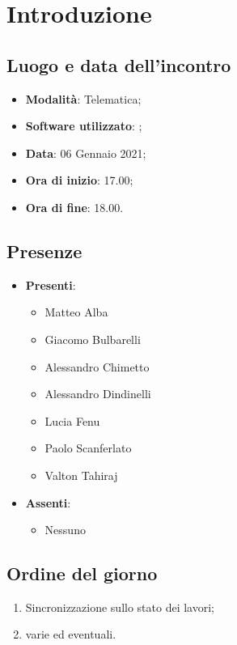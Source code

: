 \documentclass[]{article}
\begin{document}
	
	
	
	\newpage
	
	
		\section{Introduzione}
		\subsection{Luogo e data dell'incontro}
		\begin{itemize}
			\item \textbf{Modalità}: Telematica;
			\item \textbf{Software utilizzato}: ;
			\item \textbf{Data}: 06 Gennaio 2021;
			\item \textbf{Ora di inizio}: 17.00;
			\item \textbf{Ora di fine}: 18.00.
		\end{itemize}

		\subsection{Presenze}
		\begin{itemize}
			\item \textbf{Presenti}:
			\begin{itemize}
				\item Matteo Alba
				\item Giacomo Bulbarelli
				\item Alessandro Chimetto
				\item Alessandro Dindinelli
				\item Lucia Fenu
				\item Paolo Scanferlato
				\item Valton Tahiraj
			\end{itemize}
			\item \textbf{Assenti}:
			\begin{itemize}
				\item Nessuno
			\end{itemize}
		\end{itemize}


		\subsection{Ordine del giorno}
		\begin{enumerate}
			\item Sincronizzazione sullo stato dei lavori;
			\item varie ed eventuali.
		\end{enumerate}
\end{document}
